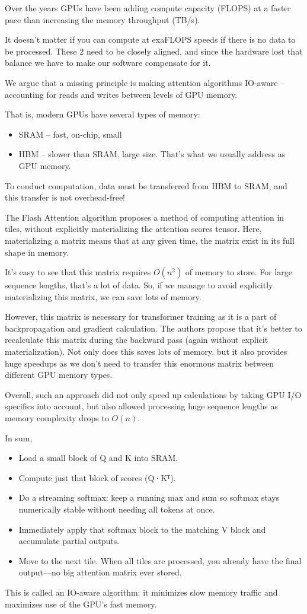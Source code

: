 Over the years GPUs have been adding compute capacity (FLOPS) at a faster pace than increasing the memory throughput (TB/s).

It doesn't matter if you can compute at exaFLOPS speeds if there is no data to be processed. These 2 need to be closely aligned, and since the hardware lost that balance we have to make our software compensate for it.




We argue that a missing principle is making attention algorithms IO-aware – accounting for reads and writes between levels of GPU memory.


That is, modern GPUs have several types of memory:
\begin{itemize}
	\item SRAM – fast, on-chip, small
	\item HBM – slower than SRAM, large size. That's what we usually address as GPU memory.
\end{itemize}

 To conduct computation, data must be transferred from HBM to SRAM, and this transfer is not overhead-free!

The Flash Attention algorithm proposes a method of computing attention in tiles, without explicitly materializing the attention scores tensor. Here, materializing a matrix means that at any given time, the matrix exist in its full shape in memory.

It's easy to see that this matrix requires $O(n^2)$ of memory to store. For large sequence lengths, that's a lot of data. So, if we manage to avoid explicitly materializing this matrix, we can save lots of memory.

However, this matrix is necessary for transformer training as it is a part of backpropagation and gradient calculation. The authors propose that it's better to recalculate this matrix during the backward pass (again without explicit materialization). Not only does this saves lots of memory, but it also provides huge speedups as we don't need to transfer this enormous matrix between different GPU memory types.

Overall, such an approach did not only speed up calculations by taking GPU I/O specifics into account, but also allowed processing huge sequence lengths as memory complexity drops to $O(n)$.


In sum,
\begin{itemize}
	\item Load a small block of Q and K into SRAM.
	\item Compute just that block of scores (Q·Kᵀ).
	\item Do a streaming softmax: keep a running max and sum so softmax stays numerically stable without needing all tokens at once.
	\item Immediately apply that softmax block to the matching V block and accumulate partial outputs.
	\item Move to the next tile. When all tiles are processed, you already have the final output—no big attention matrix ever stored.
\end{itemize}
This is called an IO-aware algorithm: it minimizes slow memory traffic and maximizes use of the GPU's fast memory.

